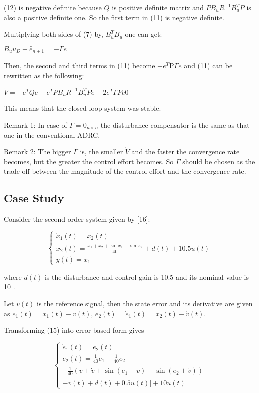\documentclass[10pt]{article}
\begin{document}
(12) is negative definite because $Q$ is positive definite matrix and $P B_{u} R^{-1} B_{u}^{T} P$ is also a positive definite one. So the first term in (11) is negative definite.

Multiplying both sides of (7) by, $B_{u}^{T} B_{u}$ one can get:

$B_{u} u_{D}+\hat{e}_{n+1}=-\Gamma e$

Then, the second and third terms in (11) become $-e^{T} \mathrm{P} \Gamma e$ and (11) can be rewritten as the following:

$\dot{V}=-e^{T} Q e-e^{T} P B_{u} R^{-1} B_{u}^{T} P e-2 e^{T} \Gamma P e 0$

This means that the closed-loop system was stable.

Remark 1: In case of $\Gamma=0_{n \times n}$ the disturbance compensator is the same as that one in the conventional ADRC.

Remark 2: The bigger $\Gamma$ is, the smaller $\dot{V}$ and the faster the convergence rate becomes, but the greater the control effort becomes. So $\Gamma$ should be chosen as the trade-off between the magnitude of the control effort and the convergence rate.

\subsection{Case Study}
Consider the second-order system given by [16]:

$$
\left\{\begin{array}{c}
\dot{x}_{1}(t)=x_{2}(t) \\
\dot{x}_{2}(t)=\frac{x_{1}+x_{2}+\sin x_{1}+\sin x_{2}}{40}+d(t)+10.5 u(t) \\
y(t)=x_{1}
\end{array}\right.
$$

where $d(t)$ is the disturbance and control gain is 10.5 and its nominal value is 10 .

Let $v(t)$ is the reference signal, then the state error and its derivative are given as $e_{1}(t)=x_{1}(t)-v(t)$, $e_{2}(t)=\dot{e}_{1}(t)=x_{2}(t)-\dot{v}(t)$.

Transforming (15) into error-based form gives

$$
\left\{\begin{array}{c}
\dot{e}_{1}(t)=e_{2}(t) \\
\dot{e}_{2}(t)=\frac{1}{40} e_{1}+\frac{1}{40} e_{2} \\
{\left[\frac{1}{40}\left(v+\dot{v}+\sin \left(e_{1}+v\right)+\sin \left(e_{2}+\dot{v}\right)\right)\right.} \\
-\ddot{v}(t)+d(t)+0.5 u(t)]+10 u(t)
\end{array}\right.
$$
\end{document}
